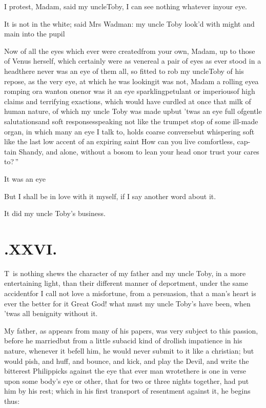 \documentclass{article}
\begin{document}
I protest, Madam, said my uncle\break Toby, I can see nothing
whatever in\break your eye.

It is not in the white; said Mrs Wadman: my uncle
Toby look’d with might and main into the
pupil\tsh

Now of all the eyes which ever were created\tsh from
your own, Madam, up to those of Venus herself, which
certainly were as venereal a pair of eyes as ever stood in a
head\tsh there never was an eye of them all, so fitted to
rob my uncle\pb Toby of his repose, as the very eye, at which
he was looking\tsh it was not, Madam a rolling
eye\tsh a romping or\break a wanton one\tsk nor was it an eye
spark\-ling\tsk petulant or imperious\tsk of high claims and
terrifying exactions, which would have curdled at once that milk of human
nature, of which my uncle Toby was made up\tsh but
’twas an eye full of\break gentle salutations\tsh and soft
responses\break\tsh speaking \tsh not like the trumpet\break
stop of some ill-made organ, in which many an eye I talk to, holds
coarse converse\tsh but whispering soft \tsh like
the last low accent of an expiring
saint\tsh\break 
\lqq How can you live comfortless, cap-\break
\lqq tain Shandy, and alone, without a\break
\lqq bosom to lean your head on\tsh or\break
\lqq trust your cares to?\,”

\newpage
It was an eye\tsh

But I shall be in love with it myself,\break
if I say another word about it.

\tsh It did my uncle Toby’s business.

\section{.\enspace XXVI.}

\lettrine{T}{\,} is nothing shews the character
of my father and my uncle Toby, in a more entertaining
light, than their different manner of deportment, under the same
accident\tsh for I call not love a misfortune, from a
persuasion, that a man’s heart is ever the better for
it\break
\tsh Great God! what must my uncle Toby’s
have been, when ’twas all benignity without it.

\newpage
My father, as appears from many of his papers, was very subject
to this passion, before he married\tsh but from a little
subacid kind of drollish impatience in his nature, whenever it
befell him, he would never submit to it like a christian; but would
pish, and huff, and bounce, and kick, and play the Devil, and write
the bitterest Philippicks against the eye that ever man
wrote\tsh there is one in verse upon some body’s eye
or other, that for two or three nights together, had put him by his
rest; which in his first transport of resentment against it, he
begins thus:
\end{document}
